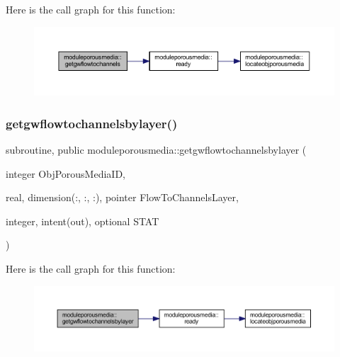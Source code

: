 Here is the call graph for this function\+:\nopagebreak
\begin{figure}[H]
\begin{center}
\leavevmode
\includegraphics[width=350pt]{namespacemoduleporousmedia_a59f51d54f2a02220e661022657f0435a_cgraph}
\end{center}
\end{figure}
\mbox{\label{namespacemoduleporousmedia_a3e1fc1f7f447b7f85698caff9d4810c7}} 
\subsubsection{\texorpdfstring{getgwflowtochannelsbylayer()}{getgwflowtochannelsbylayer()}}
{\footnotesize\ttfamily subroutine, public moduleporousmedia\+::getgwflowtochannelsbylayer (\begin{DoxyParamCaption}\item[{integer}]{Obj\+Porous\+Media\+ID,  }\item[{real, dimension(\+:, \+:, \+:), pointer}]{Flow\+To\+Channels\+Layer,  }\item[{integer, intent(out), optional}]{S\+T\+AT }\end{DoxyParamCaption})}

Here is the call graph for this function\+:\nopagebreak
\begin{figure}[H]
\begin{center}
\leavevmode
\includegraphics[width=350pt]{namespacemoduleporousmedia_a3e1fc1f7f447b7f85698caff9d4810c7_cgraph}
\end{center}
\end{figure}
\mbox{\label{namespacemoduleporousmedia_a48f51dadcb6b3234ad3625d8e26cb7bc}} 
